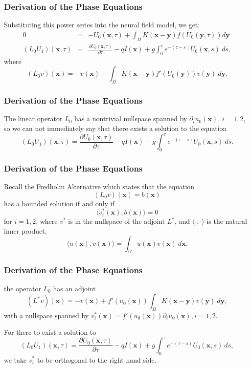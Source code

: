 \documentclass{beamer}
\newcommand{\x}{\mathbf{x}}
\newcommand{\y}{\mathbf{y}}
\newcommand{\io}{\int_\Omega}
\newcommand{\pa}{\partial}
\begin{document}
\begin{frame}
\frametitle{Derivation of the Phase Equations}
Substituting this power series into the neural field model, we get:
\begin{eqnarray*}
0 &=& -U_0(\x,\tau) + \io K(\x-\y) f(U_0(\y,\tau)) d\y \\
 (L_0U_1)(\x,\tau) &=& \frac{\partial U_0(\x,\tau)}{\partial \tau} - q I(\x) + g \int_0^\tau e^{-(\tau-s)}U_0(\x,s)\ ds,
\end{eqnarray*}
where
\[
(L_0 v)(\x) = -v(\x) + \io K(\x-\y)f'(U_0(\y))v(\y)\ d\y.
\]
\end{frame}


\begin{frame}
\frametitle{Derivation of the Phase Equations}
The linear operator $L_0$ has a nontrivial nullspace spanned by $\pa_i u_0(\x), \,i=1,2$, so we can not immediately say that there exists a solution to the equation
\begin{equation*}
 (L_0U_1)(\x,\tau)  = \frac{\partial U_0(\x,\tau)}{\partial \tau} - q I(\x) + g \int_0^\tau e^{-(\tau-s)}U_0(\x,s)\ ds.
\end{equation*}
\end{frame}

\begin{frame}
\frametitle{Derivation of the Phase Equations}
Recall the Fredholm Alternative which states that the equation
\[
(L_0v)(\x) = b(\x)
\]   
has a bounded solution if and only if
\[
\langle v^*_i(\x), b(\x)\rangle =0
\]
for $i=1,2$, where $v^*$ is in the nullspace of the adjoint $L^*$, and $\langle \cdot,\cdot \rangle$ is the natural inner product,
\[
\langle u(\x),v(\x) \rangle = \io u(\x)v(\x) \ d\x .
\]
\end{frame}

\begin{frame}
\frametitle{Derivation of the Phase Equations}

the operator $L_0$ has an adjoint
\[
(L^*v)(\x) =-v(\x) + f'(u_0(\x)) \io K(\x-\y)v(\y)\ d\y,
\] 
with a nullspace spanned by $v^*_i(\x)=f'(u_0(\x))\pa_i u_0(\x), i=1,2$.

For there to exist a solution to
\[
(L_0U_1)(\x,\tau) = \frac{\partial U_0(\x,\tau)}{\partial \tau} - q I(\x) + g \int_0^\tau e^{-(\tau-s)}U_0(\x,s)\ ds,
\]
we take $v^*_i$ to be orthogonal to the right hand side.
\end{frame}
\end{document}
